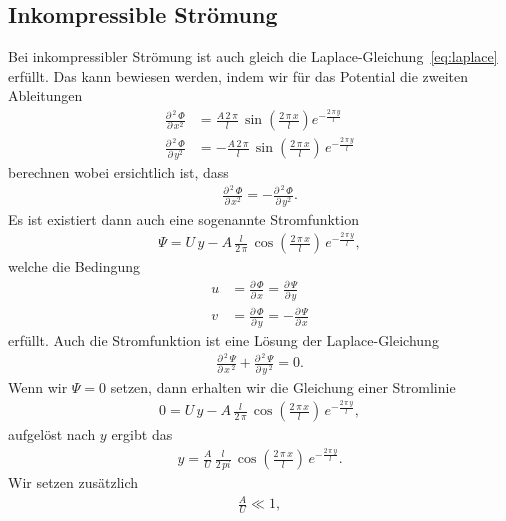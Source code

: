 \subsection{Inkompressible Strömung}
Bei inkompressibler Strömung ist auch gleich die
Laplace-Gleichung~\eqref{eq:laplace} erfüllt.
Das kann bewiesen werden, indem wir für das Potential
die zweiten Ableitungen
\begin{align*}
    \frac{\partial\,^2\,\Phi}{\partial\,x^2}
    &= \frac{A\,2\,\pi}{l}\,\sin\left(\frac{2\,\pi\,x}{l}\right)
    e^{-\frac{2\,\pi\,y}{l}} \\
    \frac{\partial\,^2\,\Phi}{\partial\,y^2}
    &= -\frac{A\,2\,\pi}{l}\,\sin\left(\frac{2\,\pi\,x}{l}\right)
    \,e^{-\frac{2\,\pi\,y}{l}}
\end{align*}
berechnen wobei ersichtlich ist, dass
\begin{align*}
    \frac{\partial\,^2\,\Phi}{\partial\,x^2}
    =
    -\frac{\partial\,^2\,\Phi}{\partial\,y^2}.
\end{align*}
Es ist existiert dann auch eine sogenannte Stromfunktion
\begin{align*}
    \Psi
    =
    U\,y - A\,\frac{l}{2\,\pi}\,\cos\left(\frac{2\,\pi\,x}{l}\right)
    \,e^{-\frac{2\,\pi\,y}{l}},
\end{align*}
welche die Bedingung
\begin{align*}
    u 
    &=
    \frac{\partial\,\Phi}{\partial\,x}
    =
    \frac{\partial\,\Psi}{\partial\,y}
    \\
    v
    &=
    \frac{\partial\,\Phi}{\partial\,y}
    =
    -\frac{\partial\,\Psi}{\partial\,x}
\end{align*}
erfüllt.
Auch die Stromfunktion ist eine Lösung der Laplace-Gleichung
\begin{align*}
    \frac{\partial\,^2\,\Psi}{\partial\,x\,^2}
    +
    \frac{\partial\,^2\,\Psi}{\partial\,y\,^2}
    =
    0.
\end{align*}
Wenn wir $\Psi = 0$ setzen, dann erhalten wir die Gleichung
einer Stromlinie
\begin{align}
    0 = U\,y - A\,\frac{l}{2\,\pi}\,
    \cos\left(\frac{2\,\pi\,x}{l}\right)\,
    e^{-\frac{2\,\pi\,y}{l}},\label{eq:stromlinie}
\end{align}
aufgelöst nach $y$ ergibt das
\begin{align*}
    y
    =
    \frac{A}{U}\,\frac{l}{2\,pi}\,
    \cos\left(\frac{2\,\pi\,x}{l}\right)\,
    e^{-\frac{2\,\pi\,y}{l}}.
\end{align*}
Wir setzen zusätzlich 
\begin{align*}
    \frac{A}{U} \ll 1,
\end{align*}
